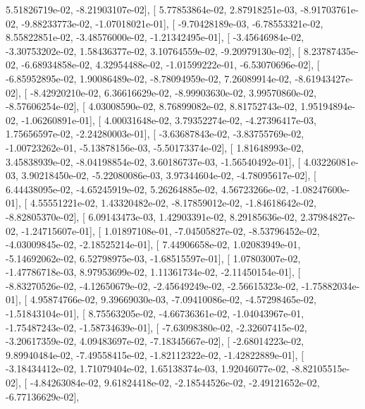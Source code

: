 \documentclass{article}
\begin{document}
          5.51826719e-02,  -8.21903107e-02],
       [  5.77853864e-02,   2.87918251e-03,  -8.91703761e-02,
         -9.88233773e-02,  -1.07018021e-01],
       [ -9.70428189e-03,  -6.78553321e-02,   8.55822851e-02,
         -3.48576000e-02,  -1.21342495e-01],
       [ -3.45646984e-02,  -3.30753202e-02,   1.58436377e-02,
          3.10764559e-02,  -9.20979130e-02],
       [  8.23787435e-02,  -6.68934858e-02,   4.32954488e-02,
         -1.01599222e-01,  -6.53070696e-02],
       [ -6.85952895e-02,   1.90086489e-02,  -8.78094959e-02,
          7.26089914e-02,  -8.61943427e-02],
       [ -8.42920210e-02,   6.36616629e-02,  -8.99903630e-02,
          3.99570860e-02,  -8.57606254e-02],
       [  4.03008590e-02,   8.76899082e-02,   8.81752743e-02,
          1.95194894e-02,  -1.06260891e-01],
       [  4.00031648e-02,   3.79352274e-02,  -4.27396417e-03,
          1.75656597e-02,  -2.24280003e-01],
       [ -3.63687843e-02,  -3.83755769e-02,  -1.00723262e-01,
         -5.13878156e-03,  -5.50173374e-02],
       [  1.81648993e-02,   3.45838939e-02,  -8.04198854e-02,
          3.60186737e-03,  -1.56540492e-01],
       [  4.03226081e-03,   3.90218450e-02,  -5.22080086e-03,
          3.97344604e-02,  -4.78095617e-02],
       [  6.44438095e-02,  -4.65245919e-02,   5.26264885e-02,
          4.56723266e-02,  -1.08247600e-01],
       [  4.55551221e-02,   1.43320482e-02,  -8.17859012e-02,
         -1.84618642e-02,  -8.82805370e-02],
       [  6.09143473e-03,   1.42903391e-02,   8.29185636e-02,
          2.37984827e-02,  -1.24715607e-01],
       [  1.01897108e-01,  -7.04505827e-02,  -8.53796452e-02,
         -4.03009845e-02,  -2.18525214e-01],
       [  7.44906658e-02,   1.02083949e-01,  -5.14692062e-02,
          6.52798975e-03,  -1.68515597e-01],
       [  1.07803007e-02,  -1.47786718e-03,   8.97953699e-02,
          1.11361734e-02,  -2.11450154e-01],
       [ -8.83270526e-02,  -4.12650679e-02,  -2.45649249e-02,
         -2.56615323e-02,  -1.75882034e-01],
       [  4.95874766e-02,   9.39669030e-03,  -7.09410086e-02,
         -4.57298465e-02,  -1.51843104e-01],
       [  8.75563205e-02,  -4.66736361e-02,  -1.04043967e-01,
         -1.75487243e-02,  -1.58734639e-01],
       [ -7.63098380e-02,  -2.32607415e-02,  -3.20617359e-02,
          4.09483697e-02,  -7.18345667e-02],
       [ -2.68014223e-02,   9.89940484e-02,  -7.49558415e-02,
         -1.82112322e-02,  -1.42822889e-01],
       [ -3.18434412e-02,   1.71079404e-02,   1.65138374e-03,
          1.92046077e-02,  -8.82105515e-02],
       [ -4.84263084e-02,   9.61824418e-02,  -2.18544526e-02,
         -2.49121652e-02,  -6.77136629e-02],
\end{document}
